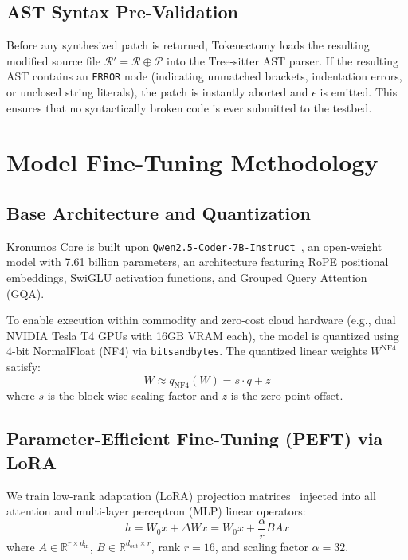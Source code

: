 \documentclass[10pt,twocolumn,letterpaper]{article}
\begin{document}
\subsection{AST Syntax Pre-Validation}
Before any synthesized patch is returned, Tokenectomy loads the resulting modified source file $\mathcal{R}' = \mathcal{R} \oplus \mathcal{P}$ into the Tree-sitter AST parser. If the resulting AST contains an \texttt{ERROR} node (indicating unmatched brackets, indentation errors, or unclosed string literals), the patch is instantly aborted and $\epsilon$ is emitted. This ensures that no syntactically broken code is ever submitted to the testbed.

\section{Model Fine-Tuning Methodology}

\subsection{Base Architecture and Quantization}
Kronumos Core is built upon \texttt{Qwen2.5-Coder-7B-Instruct}~\cite{hui2024qwen25coder}, an open-weight model with 7.61 billion parameters, an architecture featuring RoPE positional embeddings, SwiGLU activation functions, and Grouped Query Attention (GQA).

To enable execution within commodity and zero-cost cloud hardware (e.g., dual NVIDIA Tesla T4 GPUs with 16GB VRAM each), the model is quantized using 4-bit NormalFloat (NF4) via \texttt{bitsandbytes}. The quantized linear weights $W^{\text{NF4}}$ satisfy:
\begin{equation}
    W \approx q_{\text{NF4}}(W) = s \cdot q + z
\end{equation}
where $s$ is the block-wise scaling factor and $z$ is the zero-point offset.

\subsection{Parameter-Efficient Fine-Tuning (PEFT) via LoRA}
We train low-rank adaptation (LoRA) projection matrices~\cite{hu2021lora} injected into all attention and multi-layer perceptron (MLP) linear operators:
\begin{equation}
    h = W_0 x + \Delta W x = W_0 x + \frac{\alpha}{r} B A x
\end{equation}
where $A \in \mathbb{R}^{r \times d_{\text{in}}}$, $B \in \mathbb{R}^{d_{\text{out}} \times r}$, rank $r = 16$, and scaling factor $\alpha = 32$.
\end{document}

